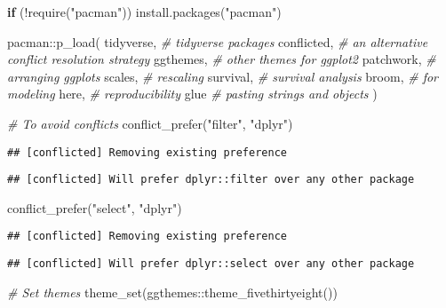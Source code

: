 \documentclass[
]{book}
\newenvironment{Shaded}{\begin{snugshade}}{\end{snugshade}}
\newcommand{\CommentTok}[1]{\textcolor[rgb]{0.56,0.35,0.01}{\textit{#1}}}
\newcommand{\ControlFlowTok}[1]{\textcolor[rgb]{0.13,0.29,0.53}{\textbf{#1}}}
\newcommand{\FunctionTok}[1]{\textcolor[rgb]{0.00,0.00,0.00}{#1}}
\newcommand{\NormalTok}[1]{#1}
\newcommand{\SpecialCharTok}[1]{\textcolor[rgb]{0.00,0.00,0.00}{#1}}
\newcommand{\StringTok}[1]{\textcolor[rgb]{0.31,0.60,0.02}{#1}}
\begin{document}
\begin{Shaded}
\begin{Highlighting}[]
\ControlFlowTok{if}\NormalTok{ (}\SpecialCharTok{!}\FunctionTok{require}\NormalTok{(}\StringTok{"pacman"}\NormalTok{)) }\FunctionTok{install.packages}\NormalTok{(}\StringTok{"pacman"}\NormalTok{)}

\NormalTok{pacman}\SpecialCharTok{::}\FunctionTok{p\_load}\NormalTok{(}
\NormalTok{ tidyverse, }\CommentTok{\# tidyverse packages }
\NormalTok{ conflicted, }\CommentTok{\# an alternative conflict resolution strategy }
\NormalTok{ ggthemes, }\CommentTok{\# other themes for ggplot2 }
\NormalTok{ patchwork, }\CommentTok{\# arranging ggplots}
\NormalTok{ scales, }\CommentTok{\# rescaling }
\NormalTok{ survival, }\CommentTok{\# survival analysis}
\NormalTok{ broom, }\CommentTok{\# for modeling}
\NormalTok{ here, }\CommentTok{\# reproducibility }
\NormalTok{ glue }\CommentTok{\# pasting strings and objects }
\NormalTok{)}

\CommentTok{\# To avoid conflicts }
\FunctionTok{conflict\_prefer}\NormalTok{(}\StringTok{"filter"}\NormalTok{, }\StringTok{"dplyr"}\NormalTok{) }
\end{Highlighting}
\end{Shaded}

\begin{verbatim}
## [conflicted] Removing existing preference
\end{verbatim}

\begin{verbatim}
## [conflicted] Will prefer dplyr::filter over any other package
\end{verbatim}

\begin{Shaded}
\begin{Highlighting}[]
\FunctionTok{conflict\_prefer}\NormalTok{(}\StringTok{"select"}\NormalTok{, }\StringTok{"dplyr"}\NormalTok{) }
\end{Highlighting}
\end{Shaded}

\begin{verbatim}
## [conflicted] Removing existing preference
\end{verbatim}

\begin{verbatim}
## [conflicted] Will prefer dplyr::select over any other package
\end{verbatim}

\begin{Shaded}
\begin{Highlighting}[]
\CommentTok{\# Set themes }
\FunctionTok{theme\_set}\NormalTok{(ggthemes}\SpecialCharTok{::}\FunctionTok{theme\_fivethirtyeight}\NormalTok{())}
\end{Highlighting}
\end{Shaded}
\end{document}
